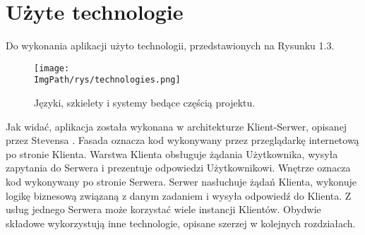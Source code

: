 \documentclass[a4paper,12pt,twoside,openany]{report}
\newcommand{\ImgPath}{.}
\begin{document}
\section{Użyte technologie}
Do wykonania aplikacji użyto technologii, przedstawionych na Rysunku 1.3.
	\begin{figure}[!htbp]
		\begin{center}
			\centering
			\texttt{[image: \\ImgPath/rys/technologies.png]}
		\end{center}
		\caption{Języki, szkielety i systemy bedące częścią projektu.}
		\label{technologies}
	\end{figure}
Jak widać, aplikacja została wykonana w architekturze Klient-Serwer, opisanej  przez Stevensa \cite{Stevens}. Fasada oznacza kod wykonywany przez przeglądarkę internetową po stronie Klienta. Warstwa Klienta obsługuje żądania Użytkownika, wysyła zapytania do Serwera i prezentuje odpowiedzi Użytkownikowi. Wnętrze oznacza kod wykonywany po stronie Serwera. Serwer nasłuchuje żądań Klienta, wykonuje logikę biznesową związaną z danym zadaniem i wysyła odpowiedź do Klienta. Z usług jednego Serwera może korzystać wiele instancji Klientów. Obydwie składowe wykorzystują inne technologie, opisane szerzej w kolejnych rozdziałach.
\end{document}
